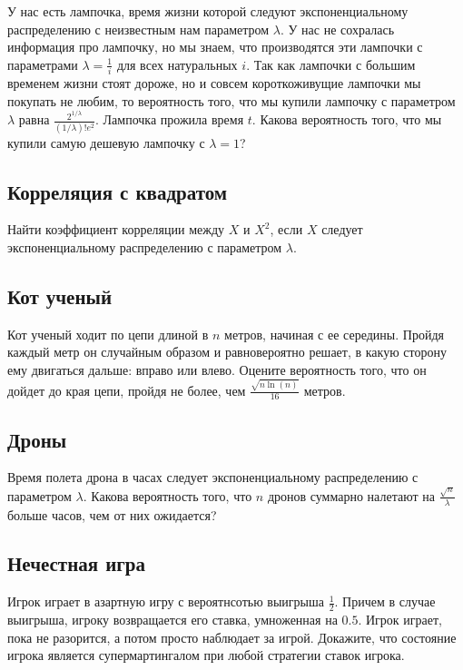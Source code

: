 \documentclass[12pt]{article}
\begin{document}
У нас есть лампочка, время жизни которой следуют экспоненциальному распределению с неизвестным нам параметром $\lambda$. У нас не сохралась информация про лампочку, но мы знаем, что производятся эти лампочки с параметрами $\lambda = \frac{1}{i}$ для всех натуральных $i$. Так как лампочки с большим временем жизни стоят дороже, но и совсем короткоживущие лампочки мы покупать не любим, то вероятность того, что мы купили лампочку с параметром $\lambda$ равна $\frac{2^{1/\lambda}}{(1/\lambda)!e^2}$. Лампочка прожила время $t$. Какова вероятность того, что мы купили самую дешевую лампочку с $\lambda = 1$?




\subsection{Корреляция с квадратом}

Найти коэффициент корреляции между $X$ и $X^2$, если $X$ следует экспоненциальному распределению с параметром $\lambda$.



\subsection{Кот ученый}

Кот ученый ходит по цепи длиной в $n$ метров, начиная с ее середины. Пройдя каждый метр он случайным образом и равновероятно решает, в какую сторону ему двигаться дальше: вправо или влево. Оцените вероятность того, что он дойдет до края цепи, пройдя не более, чем $\frac{\sqrt{n \ln(n)}}{16}$ метров.



\subsection{Дроны}

Время полета дрона в часах следует экспоненциальному распределению с параметром $\lambda$. Какова вероятность того, что $n$ дронов суммарно налетают на $\frac{\sqrt{n}}{\lambda}$ больше часов, чем от них ожидается?



\subsection{Нечестная игра}

Игрок играет в азартную игру с вероятнсотью выигрыша $\frac{1}{2}$. Причем в случае выигрыша, игроку возвращается его ставка, умноженная на $0.5$. Игрок играет, пока не разорится, а потом просто наблюдает за игрой. Докажите, что состояние игрока является супермартингалом при любой стратегии ставок игрока.
\end{document}
